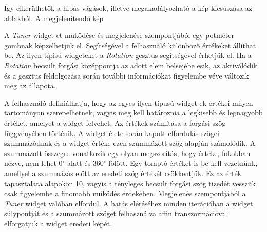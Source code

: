 Így elkerülhetők a hibás vágások, illetve megakadályozható a kép kicsúszása az ablakból.
A megjelenítendő kép


A \textit{Tuner} widget-et működése és megjelenése szempontjából egy potméter gombnak képzelhetjük el. Segítségével a felhasználó különböző értékeket állíthat be.
Az ilyen típisú widgeteket a \textit{Rotation} gesztus segítségével érhetjük el. Ha a \textit{Rotation} becsült forgási középpontja az adott elem belsejébe esik, az aktiválódik és a gesztus feldolgozása során további információkat figyelembe véve változik meg az állapota.

A felhasználó definiálhatja, hogy az egyes ilyen típusú widget-ek értékei milyen tartományon szerepelhetnek, vagyis meg kell határoznia a legkisebb és legnagyobb értéket, amelyet a widget felvehet. Az értékek számítása a forgási szög függvényében történik. A widget élete során kapott elfordulás szögei szummázódnak és a widget értéke ezen szummázott szög alapján számolódik. A szummázott összegre vonatkozik egy olyan megszorítás, hogy értéke, fokokban nézve, nem lehet 0$^{\circ}$ alatt és 360$^{\circ}$ fölött. Egy tomptó értéket is be kell vezetnünk, amellyel a szummázás előtt az eredeti szög értékét csökkentjük. Ez az érték tapasztalata alapokon 10, vagyis a tényleges becsült forgási szög tizedét vesszük csak figyelembe a finomabb működés érdekében.
Megjelenés szempontjából a \textit{Tuner} widget valóban elfordul. A hatás eléréséhez minden iterációban a widget súlypontját és a szummázott szöget felhasználva affin transzormációval elforgatjuk a widget eredeti képét.
